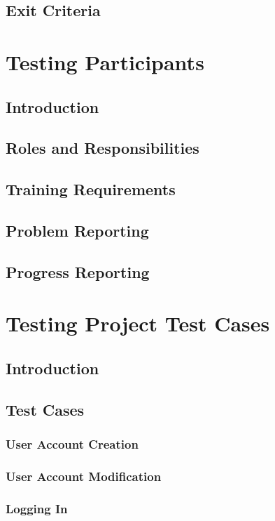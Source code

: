 \documentclass{article}
\begin{document}
\subsection{Exit Criteria}

\section{Testing Participants}

\subsection{Introduction}
\subsection{Roles and Responsibilities}
\subsection{Training Requirements}
\subsection{Problem Reporting}
\subsection{Progress Reporting}

\section{Testing Project Test Cases}

\subsection{Introduction}
\subsection{Test Cases}
\subsubsection{User Account Creation} %
\subsubsection{User Account Modification} %
\subsubsection{Logging In} %
\end{document}
